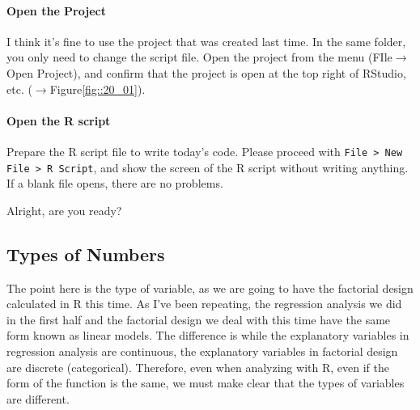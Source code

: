 \documentclass{ltjbook}
\begin{document}
\paragraph{Open the Project} I think it's fine to use the project that was created last time. In the same folder, you only need to change the script file. Open the project from the menu (FIle$\to$Open Project), and confirm that the project is open at the top right of RStudio, etc. ($\to$Figure\ref{fig::20_01}).
\paragraph{Open the R script} Prepare the R script file to write today's code. Please proceed with \verb|File > New File > R Script|, and show the screen of the R script without writing anything. If a blank file opens, there are no problems.


Alright, are you ready?

\subsection{Types of Numbers}
The point here is the type of variable, as we are going to have the factorial design calculated in R this time.
As I've been repeating, the regression analysis we did in the first half and the factorial design we deal with this time have the same form known as linear models. The difference is while the explanatory variables in regression analysis are continuous, the explanatory variables in factorial design are discrete (categorical). Therefore, even when analyzing with R, even if the form of the function is the same, we must make clear that the types of variables are different.
\end{document}
